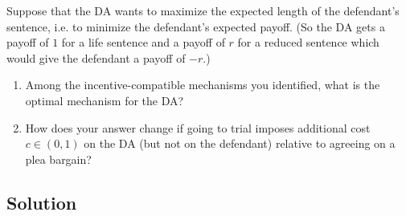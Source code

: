 \documentclass[a4paper]{article}
\newif\ifsolutions
\begin{document}
	Suppose that the DA wants to maximize the expected length of the defendant's sentence, i.e. to minimize the defendant's expected payoff. (So the DA gets a payoff of $1$ for a life sentence and a payoff of $r$ for a reduced sentence which would give the defendant a payoff of $-r$.)  
	\begin{enumerate}[resume]
		\item Among the incentive-compatible mechanisms you identified, what is the optimal mechanism for the DA?
		\item How does your answer change if going to trial imposes additional cost $c \in (0,1)$ on the DA (but not on the defendant) relative to agreeing on a plea bargain?
	\end{enumerate}
	
	
	\ifsolutions
	\subsection*{Solution}
\end{document}
